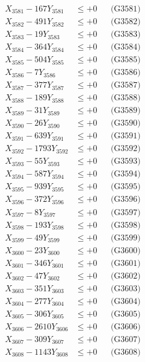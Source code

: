 \documentclass[a4paper,10pt]{article}
\begin{document}
{\begin{align}
\allowbreak
X_{3581} - 167Y_{3581} &\leq +0 && \text{(G3581)} \\
X_{3582} - 491Y_{3582} &\leq +0 && \text{(G3582)} \\
X_{3583} - 19Y_{3583} &\leq +0 && \text{(G3583)} \\
X_{3584} - 364Y_{3584} &\leq +0 && \text{(G3584)} \\
X_{3585} - 504Y_{3585} &\leq +0 && \text{(G3585)} \\
X_{3586} - 7Y_{3586} &\leq +0 && \text{(G3586)} \\
X_{3587} - 377Y_{3587} &\leq +0 && \text{(G3587)} \\
X_{3588} - 189Y_{3588} &\leq +0 && \text{(G3588)} \\
X_{3589} - 31Y_{3589} &\leq +0 && \text{(G3589)} \\
X_{3590} - 26Y_{3590} &\leq +0 && \text{(G3590)} \\
\allowbreak
X_{3591} - 639Y_{3591} &\leq +0 && \text{(G3591)} \\
X_{3592} - 1793Y_{3592} &\leq +0 && \text{(G3592)} \\
X_{3593} - 55Y_{3593} &\leq +0 && \text{(G3593)} \\
X_{3594} - 587Y_{3594} &\leq +0 && \text{(G3594)} \\
X_{3595} - 939Y_{3595} &\leq +0 && \text{(G3595)} \\
X_{3596} - 372Y_{3596} &\leq +0 && \text{(G3596)} \\
X_{3597} - 8Y_{3597} &\leq +0 && \text{(G3597)} \\
X_{3598} - 193Y_{3598} &\leq +0 && \text{(G3598)} \\
X_{3599} - 49Y_{3599} &\leq +0 && \text{(G3599)} \\
X_{3600} - 23Y_{3600} &\leq +0 && \text{(G3600)} \\
\allowbreak
X_{3601} - 346Y_{3601} &\leq +0 && \text{(G3601)} \\
X_{3602} - 47Y_{3602} &\leq +0 && \text{(G3602)} \\
X_{3603} - 351Y_{3603} &\leq +0 && \text{(G3603)} \\
X_{3604} - 277Y_{3604} &\leq +0 && \text{(G3604)} \\
X_{3605} - 306Y_{3605} &\leq +0 && \text{(G3605)} \\
X_{3606} - 2610Y_{3606} &\leq +0 && \text{(G3606)} \\
X_{3607} - 309Y_{3607} &\leq +0 && \text{(G3607)} \\
X_{3608} - 1143Y_{3608} &\leq +0 && \text{(G3608)} \\

\end{align}}
\end{document}
